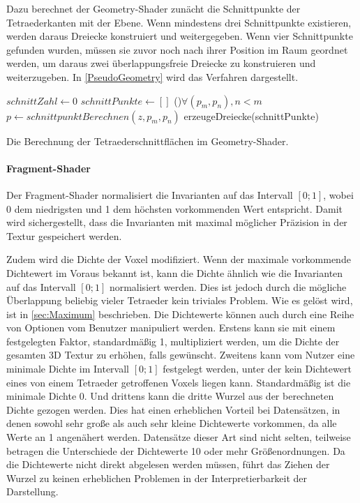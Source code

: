 \documentclass[a4paper,fontsize=12pt,toc=bib,parskip=half,ngerman]{scrartcl}
\begin{document}
Dazu berechnet der Geometry-Shader zun\"acht die Schnittpunkte der Tetraederkanten mit der Ebene. Wenn mindestens drei Schnittpunkte existieren, werden  daraus Dreiecke konstruiert und weitergegeben. Wenn vier Schnittpunkte gefunden wurden, m\"ussen sie zuvor noch nach ihrer Position im Raum geordnet werden, um daraus zwei \"uberlappungsfreie Dreiecke zu konstruieren und weiterzugeben. In \cref{PseudoGeometry} wird das Verfahren dargestellt.

\begin{algorithm}
	$schnittZahl \gets 0$\;
	$schnittPunkte \gets []$\;
	\For(){$\forall (p_m,p_n), n < m$}{
		$p \gets schnittpunktBerechnen(z,p_m,p_n)$\;
	}
	erzeugeDreiecke(schnittPunkte)\;
	\vspace{0.5cm}
	\caption{Die Berechnung der Tetraederschnittfl\"achen im Geometry-Shader.}
	\label{PseudoGeometry}
\end{algorithm}

\paragraph{Fragment-Shader}
Der Fragment-Shader normalisiert die Invarianten auf das Intervall $[0;1]$, wobei 0 dem niedrigsten und 1 dem h\"ochsten vorkommenden Wert entspricht. Damit wird sichergestellt, dass die Invarianten mit maximal m\"oglicher Pr\"azision in der Textur gespeichert werden.

Zudem wird die Dichte der Voxel modifiziert. Wenn der maximale vorkommende Dichtewert im Voraus bekannt ist, kann die Dichte \"ahnlich wie die Invarianten auf das Intervall $[0;1]$ normalisiert werden. Dies ist jedoch durch die m\"ogliche \"Uberlappung beliebig vieler Tetraeder kein triviales Problem. Wie es gel\"ost wird, ist in \cref{sec:Maximum} beschrieben. Die Dichtewerte k\"onnen auch durch eine Reihe von Optionen vom Benutzer manipuliert werden. Erstens kann sie mit einem festgelegten Faktor, standardm\"a{\ss}ig 1, multipliziert werden, um die Dichte der gesamten 3D Textur zu erh\"ohen, falls gew\"unscht. Zweitens kann vom Nutzer eine minimale Dichte im Intervall $[0;1]$ festgelegt werden, unter der kein Dichtewert eines von einem Tetraeder getroffenen Voxels liegen kann. Standardm\"a{\ss}ig ist die minimale Dichte 0. Und drittens kann die dritte Wurzel aus der berechneten Dichte gezogen werden. Dies hat einen erheblichen Vorteil bei Datens\"atzen, in denen sowohl sehr gro{\ss}e als auch sehr kleine Dichtewerte vorkommen, da alle Werte an 1 angen\"ahert werden. Datens\"atze dieser Art sind nicht selten, teilweise betragen die Unterschiede der Dichtewerte 10 oder mehr Gr\"o{\ss}enordnungen. Da die Dichtewerte nicht direkt abgelesen werden m\"ussen, f\"uhrt das Ziehen der Wurzel zu keinen erheblichen Problemen in der Interpretierbarkeit der Darstellung.
\end{document}
